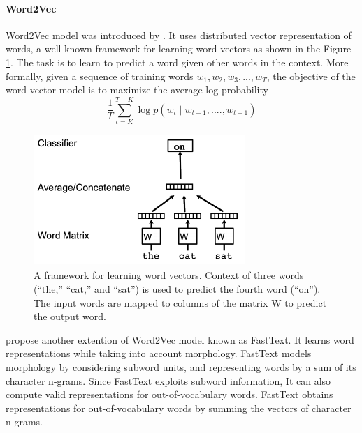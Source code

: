 \paragraph{Word2Vec} Word2Vec model was  introduced by \cite{mikolov2013efficient}. It uses distributed vector representation of words, a well-known framework for learning word vectors as shown in the Figure \ref{fig:Word2Vec model}. The task is to learn to predict a word given other words in the context.
More formally, given a sequence of training words
$w_{1}, w_{2}, w_{3}, ..., w_{T} $, the objective of the word vector model is to maximize the average log probability
\\
\begin{equation}
\frac{1}{T} \sum_{t=K}^{T-K} \log p(w_{t} \mid w_{t-1},....,w_{t+1}) 
\end{equation}

\begin{figure}[h]
	\centering
	\includegraphics[width=8cm, height=5cm]{w2v.png}
	\caption{A framework for learning word vectors. Context of
		three words (“the,” “cat,” and “sat”) is used to predict the fourth
		word (“on”). The input words are mapped to columns of the matrix
		W to predict the output word.}
	\label{fig:Word2Vec model}
\end{figure}


 \cite{bojanowski2016enriching} propose another extention of Word2Vec model known as FastText. It learns word
 representations while taking into account morphology.
 FastText models morphology by considering subword
 units, and representing words by a sum of its character
 n-grams.  Since FastText exploits subword information, It can also
 compute valid representations for out-of-vocabulary
 words. FastText obtains representations for out-of-vocabulary words by summing the vectors of character
 n-grams.
  
